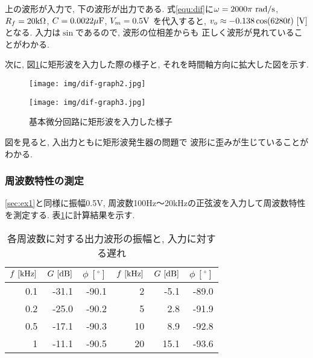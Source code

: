 \documentclass[titlepage]{jsarticle}
\begin{document}
            上の波形が入力で, 下の波形が出力である.
            式\ref{equ:dif}に$\omega = 2000\pi \ \rm{rad/s}$,
            $R_f = 20 \rm{k\Omega}$, $C = 0.0022 \rm{\mu F}$,
            $V_m = 0.5 \rm{V}$
            を代入すると, $v_o \approx -0.138 \cos(6280t) \ \rm{[V]}$となる.
            入力は$\sin$であるので, 波形の位相差からも
            正しく波形が見れていることがわかる.

            次に, 図\ref{fig:dif2}に矩形波を入力した際の様子と,
            それを時間軸方向に拡大した図を示す.

            \begin{figure}[h]
                \begin{minipage}{0.5\hsize}
                    \centering
                    \texttt{[image: img/dif-graph2.jpg]}
                \end{minipage}
                \begin{minipage}{0.5\hsize}
                    \centering
                    \texttt{[image: img/dif-graph3.jpg]}
                \end{minipage}
                \caption{基本微分回路に矩形波を入力した様子}
                \label{fig:dif2}
            \end{figure}

            図を見ると,
            入出力ともに矩形波発生器の問題で
            波形に歪みが生じていることがわかる.

        \subsubsection{周波数特性の測定} \label{sec:ex2}
            \ref{sec:ex1}と同様に振幅0.5V,
            周波数100Hz〜20kHzの正弦波を入力して周波数特性を測定する.
            表\ref{tab:dif}に計算結果を示す.

            \begin{table}[h]
                \caption{各周波数に対する出力波形の振幅と, 入力に対する遅れ}
                \label{tab:dif}
                \centering
                \begin{tabular}{r|rr||r|rr}
                    $f \ [\rm{kHz}]$ & $G \ [\rm{dB}]$ & $\phi \ [^\circ]$ & $f \ [\rm{kHz}]$ & $G \ [\rm{dB}]$ & $\phi \ [^\circ]$ \\ \hline \hline
                    0.1 & -31.1 & -90.1 & 2 & -5.1 & -89.0 \\
                    0.2 & -25.0 & -90.2 & 5 & 2.8 & -91.9 \\
                    0.5 & -17.1 & -90.3 & 10 & 8.9 & -92.8 \\
                    1 & -11.1 & -90.5 & 20 & 15.1 & -93.6 \\
                \end{tabular}
            \end{table}
\end{document}
